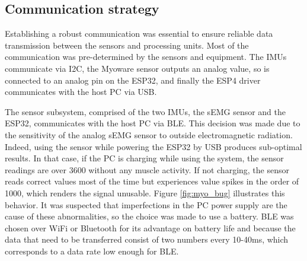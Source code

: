 \subsection{Communication strategy}
Establishing a robust communication was essential to ensure reliable data 
transmission between the sensors and processing units. Most of the communication 
was pre-determined by the sensors and equipment. The IMUs communicate via I2C, 
the Myoware sensor outputs an analog value, so is connected to an analog pin 
on the ESP32, and finally the ESP4 driver communicates with the host PC via USB.  

The sensor subsystem, comprised of the two IMUs, the sEMG sensor and the ESP32, 
communicates with the host PC via BLE. This decision was made due to the sensitivity 
of the analog sEMG sensor to outside electromagnetic radiation. Indeed, using 
the sensor while powering the ESP32 by USB produces sub-optimal results. In that 
case, if the PC is charging while using the system, the sensor readings are over 
3600 without any muscle activity. If not charging, the sensor reads correct values 
most of the time but experiences value spikes in the order of 1000, which renders 
the signal unusable. Figure \ref{fig:myo_bug} illustrates this behavior.
It was suspected that imperfections in the PC power supply 
are the cause of these abnormalities, so the choice was made to use a battery. 
BLE was chosen over WiFi or Bluetooth for its advantage on battery life and 
because the data that need to be transferred consist of two numbers every 10-40ms, 
which corresponds to a data rate low enough for BLE. 

